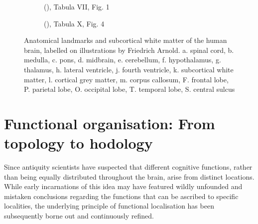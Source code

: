 \begin{figure}[h!]
  \begin{subfigure}[b]{0.5\textwidth}
    
    \caption{\citeauthor{Arnold1838} (\citeyear{Arnold1838})\autocite{Arnold1838}, Tabula VII, Fig. 1}\label{fig:ardnoldVII1}
  \end{subfigure}%
  \begin{subfigure}[b]{0.5\textwidth}
    
    \caption{\citeauthor{Arnold1838} (\citeyear{Arnold1838})\autocite{Arnold1838}, Tabula X, Fig. 4}\label{fig:ardnoldX4}
  \end{subfigure}
  \caption[Anatomical landmarks and subcortical white matter of the human brain]{Anatomical landmarks and subcortical white matter of the human brain, labelled on illustrations by Friedrich Arnold\autocite{Arnold1838}. a. spinal cord, b. medulla, c. pons, d. midbrain, e. cerebellum, f. hypothalamus, g. thalamus, h. lateral ventricle, j. fourth ventricle, k. subcortical white matter, l. cortical grey matter, m. corpus callosum, F. frontal lobe, P. parietal lobe, O. occipital lobe, T. temporal lobe, S. central sulcus}
  \label{fig:anat2}
\end{figure}


\section{Functional organisation: From topology to hodology}\label{sec:hodology}

Since antiquity scientists have suspected that different cognitive functions, rather than being equally distributed throughout the brain, arise from distinct locations.
While early incarnations of this idea may have featured wildly unfounded and mistaken conclusions regarding the functions that can be ascribed to specific localities, the underlying principle of functional localisation has been subsequently borne out and continuously refined.

